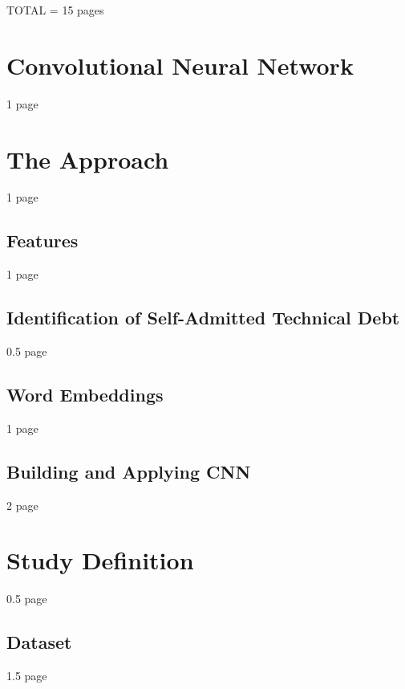 \label{sec:Theme3}

TOTAL = 15 pages

%	

\section{Convolutional Neural Network}

1 page

\section{The Approach}

1 page

\subsection{Features}

1 page

\subsection{Identification of Self-Admitted Technical Debt}

0.5 page

\subsection{Word Embeddings}

1 page

\subsection{Building and Applying CNN}

2 page

\section{Study Definition}

0.5 page

\subsection{Dataset}

1.5 page

